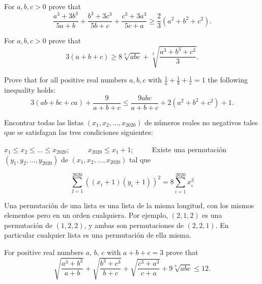 \documentclass[11pt]{scrartcl}
\begin{document}
\begin{problem} [USAJMO 2012/3]
     For $a,b,c > 0$ prove that
  \[ \frac{a^3+3b^3}{5a+b}
  + \frac{b^3+3c^3}{5b+c}
  + \frac{c^3+3a^3}{5c+a}
  \ge \frac23(a^2+b^2+c^2).  \]
\end{problem}

\begin{problem} 
     For $a,b,c > 0$ prove that
  \[ 3(a+b+c) \ge 8\sqrt[3]{abc} + \sqrt[3]{\frac{a^3+b^3+c^3}{3}}. \]
\end{problem}

\begin{problem} 
      Prove that for all positive real numbers $a, b, c$
  with $\frac{1}{a}+\frac{1}{b}+\frac{1}{c} =1$ the following inequality holds:
  \[ 3(ab+bc+ca)+\frac{9}{a+b+c} \le \frac{9abc}{a+b+c} +
  2(a^2+b^2+c^2)+1. \]
\end{problem}

\begin{problem}
    [EGMO 2020/2]
    
    Encontrar todas las listas $(x_1, x_2, \ldots, x_{2020})$ de números reales no negativos tales que se satisfagan las tres condiciones siguientes:

    $x_1 \le x_2 \le \ldots \le x_{2020}$; $\qquad$  
    $x_{2020} \le x_1 + 1$;  $\qquad$ 
    Existe una permutación $(y_1, y_2, \ldots, y_{2020})$ de $(x_1, x_2, \ldots, x_{2020})$ tal que

\[\sum_{I = 1}^{2020} ((x_i + 1)(y_i + 1))^2 = 8 \sum_{i = 1}^{2020} x_i^3\]


Una permutación de una lista es una lista de la misma longitud, con los mismos elementos pero en un
orden cualquiera. Por ejemplo, $(2, 1, 2)$ es una permutación de $(1, 2, 2)$, y ambas son permutaciones
de $(2, 2, 1)$. En particular cualquier lista es una permutación de ella misma.
    
\end{problem}

\begin{problem} [MOP 2011]
      For positive real numbers $a$, $b$, $c$ with $a+b+c=3$ prove that
  \[
  \sqrt{\frac{a^3+b^3}{a+b}}
  + \sqrt{\frac{b^3+c^3}{b+c}}
  + \sqrt{\frac{c^3+a^3}{c+a}}
  + 9\sqrt[3]{abc} \le 12.
  \]
\end{problem}
\end{document}
